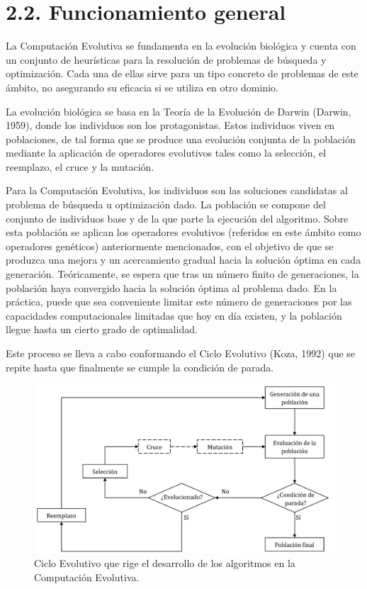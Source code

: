\documentclass[spanish,a4paper,12pt,twoside]{report}
\begin{document}
  \section*{\Large 2.2. Funcionamiento general}
  La Computación Evolutiva se fundamenta en la evolución biológica y cuenta con un conjunto de heurísticas para la resolución de problemas de búsqueda y optimización. Cada una de ellas sirve para un tipo concreto de problemas de este ámbito, no asegurando su eficacia si se utiliza en otro dominio. \par
  La evolución biológica se basa en la Teoría de la Evolución de Darwin (Darwin, 1959), donde los individuos son los protagonistas. Estos individuos viven en poblaciones, de tal forma que se produce una evolución conjunta de la población mediante la aplicación de operadores evolutivos tales como la selección, el reemplazo, el cruce y la mutación. \par
  Para la Computación Evolutiva, los individuos son las soluciones candidatas al problema de búsqueda u optimización dado. La población se compone del conjunto de individuos base y de la que parte la ejecución del algoritmo. Sobre esta población se aplican los operadores evolutivos (referidos en este ámbito como operadores genéticos) anteriormente mencionados, con el objetivo de que se produzca una mejora y un acercamiento gradual hacia la solución óptima en cada generación. Teóricamente, se espera que tras un número finito de generaciones, la población haya convergido hacia la solución óptima al problema dado. En la práctica, puede que sea conveniente limitar este número de generaciones por las capacidades computacionales limitadas que hoy en día existen, y la población llegue hasta un cierto grado de optimalidad. \par
  Este proceso se lleva a cabo conformando el Ciclo Evolutivo (Koza, 1992) que se repite hasta que finalmente se cumple la condición de parada.
  \begin{figure}[H]
    \centering
    \includegraphics[width = 1\textwidth]{resources/Fig1.pdf}
    \caption{Ciclo Evolutivo que rige el desarrollo de los algoritmos en la Computación Evolutiva.}
    \label{fig:1}
  \end{figure}
\end{document}
